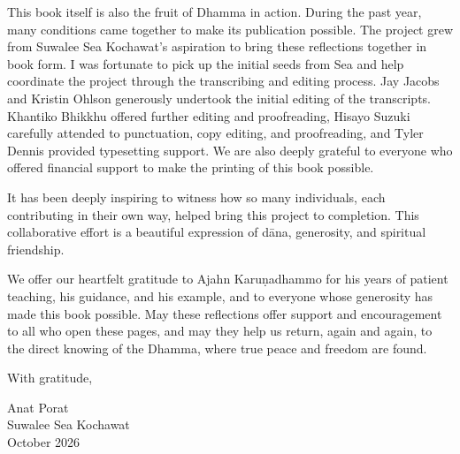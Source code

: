 This book itself is also the fruit of Dhamma in action. During the past year, many conditions came together to make its publication possible. The project grew from Suwalee Sea Kochawat's aspiration to bring these reflections together in book form. I was fortunate to pick up the initial seeds from Sea and help coordinate the project through the transcribing and editing process. Jay Jacobs and Kristin Ohlson generously undertook the initial editing of the transcripts. Khantiko Bhikkhu offered further editing and proofreading, Hisayo Suzuki carefully attended to punctuation, copy editing, and proofreading, and Tyler Dennis provided typesetting support. We are also deeply grateful to everyone who offered financial support to make the printing of this book possible.

It has been deeply inspiring to witness how so many individuals, each contributing in their own way, helped bring this project to completion. This collaborative effort is a beautiful expression of dāna, generosity, and spiritual friendship.

We offer our heartfelt gratitude to Ajahn Karuṇadhammo for his years of patient teaching, his guidance, and his example, and to everyone whose generosity has made this book possible. May these reflections offer support and encouragement to all who open these pages, and may they help us return, again and again, to the direct knowing of the Dhamma, where true peace and freedom are found.

\vspace{1\baselineskip}

{\raggedleft
With gratitude,

  Anat Porat\\
  Suwalee Sea Kochawat\\
  October 2026
\par}
